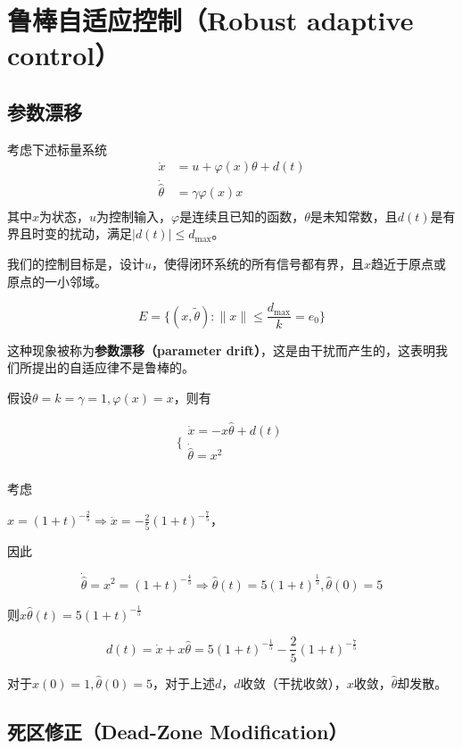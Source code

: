 \section{鲁棒自适应控制（Robust adaptive control）}\label{4Eref}
\subsection{参数漂移}
考虑下述标量系统
\[\begin{aligned}
\dot{x} & = u + \varphi(x)\theta + d(t) \\
\dot{\hat{\theta}} & = \gamma\varphi(x)x \\
\end{aligned}\]
其中$x$为状态，$u$为控制输入，$\varphi$是连续且已知的函数，$\theta$是未知常数，且$d(t)$是有界且时变的扰动，满足$|d(t)|\le d_{\max}$。

我们的控制目标是，设计$u$，使得闭环系统的所有信号都有界，且$x$趋近于原点或原点的一小邻域。

\[E = \{(x,\tilde{\theta}): \parallel x \parallel \leq \frac{d_{\max}}{k} = e_{0}\}\]

这种现象被称为{\bf 参数漂移（parameter drift）}，这是由干扰而产生的，这表明我们所提出的自适应律不是鲁棒的。

\begin{example}
    假设\(\theta = k = \gamma = 1,\varphi(x) = x\)，则有

\[\{\begin{matrix}
\dot{x} = - x\hat{\theta} + d(t) \\
\dot{\hat{\theta}} = x^{2} \\
\end{matrix}\]

考虑

\(x = (1 + t)^{- \frac{2}{5}} \Longrightarrow \dot{x} = - \frac{2}{5}(1 + t)^{- \frac{7}{5}}\)，

因此

\[\dot{\hat{\theta}} = x^{2} = (1 + t)^{- \frac{4}{5}} \Longrightarrow \hat{\theta}(t) = 5(1 + t)^{\frac{1}{5}},\hat{\theta}(0) = 5\]

则\(x\hat{\theta}(t) = 5(1 + t)^{- \frac{1}{5}}\)

\[d(t) = \dot{x} + x\hat{\theta} = 5(1 + t)^{- \frac{1}{5}} - \frac{2}{5}(1 + t)^{- \frac{7}{5}}\]

对于\(x(0) = 1,\hat{\theta}(0) = 5\)，对于上述\(d\)，\(d\)收敛（干扰收敛），\(x\)收敛，\(\hat{\theta}\)却发散。
\end{example}

\subsection{死区修正（Dead-Zone Modification）}

